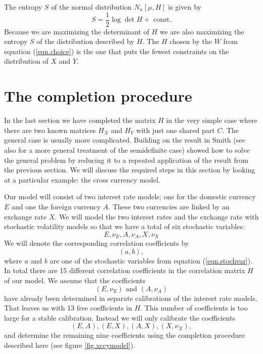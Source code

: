 \documentclass[11pt, a4paper]{article}
\begin{document}
The entropy $S$ of the normal distribution $N_n[\mu,H]$ is given by
\begin{equation}
	S = \frac{1}{2}\log \det H + \text{\ const.}
\end{equation} 
Because we are maximizing the determinant of $H$ we are also maximizing the entropy $S$ of the distribution described by $H$. The $H$ chosen by the $W$ from equation (\ref{eqn.choice}) is the one that puts the fewest constraints on the distribution of $X$ and $Y$. 

\section{The completion procedure}\label{sec.procedure}
In the last section we have completed the matrix $H$ in the very simple case where there are two known matrices $H_X$ and $H_Y$ with just one shared part $C$. The general case is usually more complicated. Building on the result in \cite{grone} Smith \cite{smith} (see also \cite{ksd} for a more general treatment of the semidefinite case) showed how to solve the general problem by reducing it to a repeated application of the result from the previous section. We will discuss the required steps in this section by looking at a particular example: the cross currency model.

Our model will consist of two interest rate models; one for the domestic currency $E$ and one the foreign currency $A$. These two currencies are linked by an exchange rate $X$. We will model the two interest rates and the exchange rate with stochastic volatility models so that we have a total of six stochastic variables:
\begin{equation}\label{eqn.stochvar}
	E, \nu_E, A, \nu_A, X, \nu_X
\end{equation}
We will denote the corresponding correlation coefficients by 
\begin{equation}
	(a,b),
\end{equation}
where $a$ and $b$ are one of the stochastic variables from equation (\ref{eqn.stochvar}). In total there are 15 different correlation coefficients in the correlation matrix $H$ of our model. We assume that the coefficients 
\begin{equation}
	(E,\nu_E)\text{\ and\ }(A,\nu_A)
\end{equation}
have already been determined in separate calibrations of the interest rate models. That leaves us with 13 free coefficients in $H$. This number of coefficients is too large for a stable calibration. Instead we will only calibrate the coefficients
\begin{equation}
	(E,A), (E,X), (A,X),(X,\nu_X),
\end{equation}
and determine the remaining nine coefficients using the completion procedure described here (see figure \ref{fig.xccymodel}).
\end{document}
